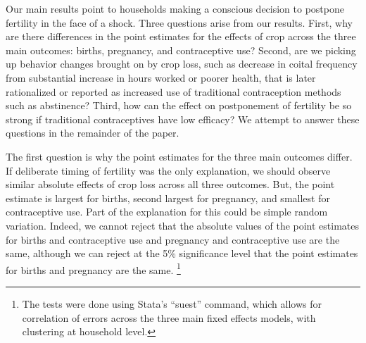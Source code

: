 \documentclass[letterpaper,12pt]{article}
\begin{document}
Our main results point to households making a conscious decision
to postpone fertility in the face of a shock.
Three questions arise from our results.
First, 
why are there differences in the point estimates for
the effects of crop across the three main outcomes: 
births, pregnancy, and contraceptive use?
Second, 
are we picking up behavior changes brought on by
crop loss, such as decrease in coital frequency from substantial
increase in hours worked or poorer health, that is later 
rationalized or reported as increased use of traditional 
contraception methods such as abstinence?
Third, 
how can the effect on postponement of fertility be so
strong if traditional contraceptives have low efficacy?
We attempt to answer these questions in the remainder of the paper.

The first question is why the point estimates for the three main 
outcomes differ.
If deliberate timing of fertility was the only explanation, 
we should observe similar absolute effects of crop loss across all three outcomes.
But, the point estimate is largest for births, second largest for pregnancy, 
and smallest for contraceptive use.
Part of the explanation for this could be simple random variation.
Indeed, we cannot reject that the absolute values of the point 
estimates for births and contraceptive use and pregnancy and contraceptive use are
the same, although we can reject at the 5\% significance level that the
point estimates for births and pregnancy are the same.%
\footnote{
The tests were done using Stata's ``suest'' command, which allows for correlation 
of errors across the three main fixed effects models,  with clustering at
household level. 
}
\end{document}
